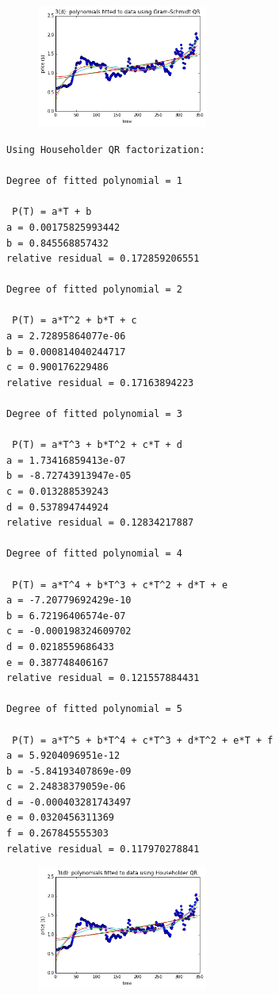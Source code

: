 \documentclass[10pt]{article}
\begin{document}
\begin{enumerate}
\begin{figure}[H]
  \centering
    \includegraphics[width=0.5\textwidth]{p3fig1}
\end{figure}

\begin{verbatim}
Using Householder QR factorization:

Degree of fitted polynomial = 1

 P(T) = a*T + b
a = 0.00175825993442
b = 0.845568857432
relative residual = 0.172859206551

Degree of fitted polynomial = 2

 P(T) = a*T^2 + b*T + c
a = 2.72895864077e-06
b = 0.000814040244717
c = 0.900176229486
relative residual = 0.17163894223

Degree of fitted polynomial = 3

 P(T) = a*T^3 + b*T^2 + c*T + d
a = 1.73416859413e-07
b = -8.72743913947e-05
c = 0.013288539243
d = 0.537894744924
relative residual = 0.12834217887

Degree of fitted polynomial = 4

 P(T) = a*T^4 + b*T^3 + c*T^2 + d*T + e
a = -7.20779692429e-10
b = 6.72196406574e-07
c = -0.000198324609702
d = 0.0218559686433
e = 0.387748406167
relative residual = 0.121557884431

Degree of fitted polynomial = 5

 P(T) = a*T^5 + b*T^4 + c*T^3 + d*T^2 + e*T + f
a = 5.9204096951e-12
b = -5.84193407869e-09
c = 2.24838379059e-06
d = -0.000403281743497
e = 0.0320456311369
f = 0.267845555303
relative residual = 0.117970278841
\end{verbatim}

\begin{figure}[H]
  \centering
    \includegraphics[width=0.5\textwidth]{p3fig2}
\end{figure}


\end{enumerate}
\end{document}
